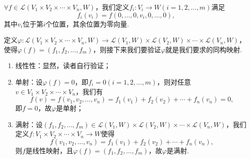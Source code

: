 \begin{solution}
    $\forall f\in \mathcal{L}(V_1 \times V_2 \times \cdots \times V_n,W)$，我们定义$f_i:V_i\to W(i=1,2,\ldots,m)$满足
    \[f_i(v_i)=f(0,\ldots,0,v_i,0,\ldots,0),\]
    其中$v_i$位于第$i$个位置，其余位置为零向量.

    定义$\varphi:\mathcal{L}(V_1 \times V_2 \times \cdots \times V_n,W)\to \mathcal{L}(V_1,W) \times \mathcal{L}(V_2,W) \times \cdots \times \mathcal{L}(V_n,W)$，使得$\varphi(f)=(f_1,f_2,\ldots,f_m)$，则接下来我们要验证$\varphi$就是我们要求的同构映射.
    \begin{enumerate}
        \item 线性性：显然，读者自行验证；
        \item 单射：设$\varphi(f)=0$，即$f_i=0(i=1,2,\ldots,m)$，则对任意$v\in V_1 \times V_2 \times \cdots \times V_n$，我们有
              \[f(v)=f(v_1,v_2,\ldots,v_n)=f_1(v_1)+f_2(v_2)+\cdots+f_n(v_n)=0,\]
              即$f=0$，故$\varphi$是单射；
        \item 满射：设$(f_1,f_2,\ldots,f_m)\in \mathcal{L}(V_1,W) \times \mathcal{L}(V_2,W) \times \cdots \times \mathcal{L}(V_n,W)$，我们定义$f:V_1 \times V_2 \times \cdots \times V_n\to W$使得
              \[f(v_1,v_2,\ldots,v_n)=f_1(v_1)+f_2(v_2)+\cdots+f_n(v_n),\]
              则$f$是线性映射，且$\varphi(f)=(f_1,f_2,\ldots,f_m)$，故$\varphi$是满射.
    \end{enumerate}
\end{solution}

